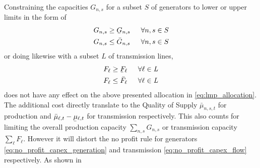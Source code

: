 \documentclass[11pt,twocolumn]{article}
\newcommand{\ubar}[1]{\underaccent{\bar}{#1}}
\newcommand{\hpad}{\hspace{15pt}}
\newcommand{\capacityGeneration}{G_{n,s}}
\newcommand{\capacityGenerationUpper}{\bar{G}_{n,s}}
\newcommand{\capacityGenerationLower}{\ubar{G}_{n,s}}
\newcommand{\capacityFlow}{F_{\ell}}
\newcommand{\capacityFlowUpper}{\bar{F}_{\ell}}
\newcommand{\capacityFlowLower}{\ubar{F}_{\ell}}
\newcommand{\muuppergeneration}[1][n]{\bar{\mu}_{#1,s,t}}
\newcommand{\mulowerflow}{\ubar{\mu}_{\ell,t}}
\newcommand{\muupperflow}{\bar{\mu}_{\ell,t}}
\begin{document}
Constraining the capacities $\capacityGeneration$  for a subset $S$ of generators to lower or upper limits in the form of 
\begin{align}
\capacityGeneration \ge \capacityGenerationLower \hpad \forall{n,s \in S} \\
\capacityGeneration \le \capacityGenerationUpper \hpad \forall{n,s \in S}
\end{align}
or doing likewise with a subset $L$ of transmission lines,
\begin{align}
\capacityFlow \ge \capacityFlowLower \hpad \forall{\ell \in \textit{L}} \\
\capacityFlow \le \capacityFlowUpper \hpad \forall{\ell \in \textit{L}}
\end{align}
does not have any effect on the above presented allocation in \cref{eq:lmp_allocation}. The additional cost directly translate to the Quality of Supply $\muuppergeneration$ for production and $\muupperflow - \mulowerflow$ for transmission respectively. This also counts for limiting the overall production capacity $\sum_{n,s}\capacityGeneration$ or transmission capacity $\sum_\ell \capacityFlow$. However it will distort the no profit rule for generators \cref{eq:no_profit_capex_generation} and transmission \cref{eq:no_profit_capex_flow} respectively. As shown in \cite{brown}
\end{document}
